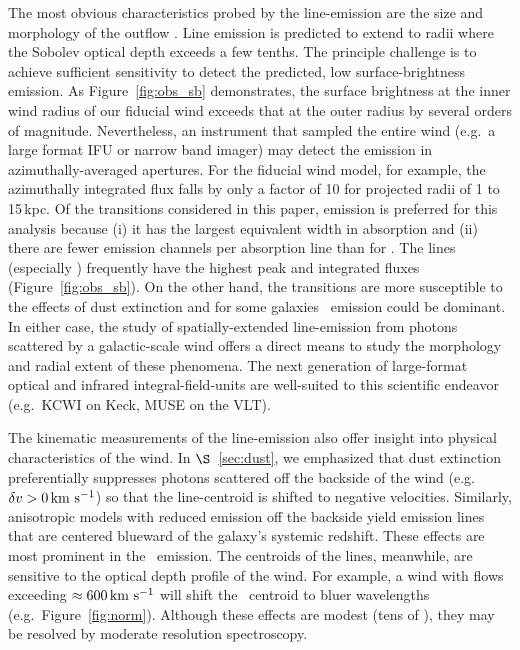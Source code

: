 \documentclass[]{emulateapj}
\begin{document}
The most obvious characteristics probed by the line-emission are
the size and morphology of the outflow \citep{rubin+10c}.  
Line emission is predicted to extend to radii where the Sobolev
optical depth exceeds a few tenths.  The principle
challenge is to achieve sufficient sensitivity to detect the
predicted,
low surface-brightness emission. As Figure~\ref{fig:obs_sb}
demonstrates, the surface brightness at the inner wind radius of our
fiducial wind exceeds that at the outer radius by several orders of magnitude.
Nevertheless, an instrument that sampled the entire wind (e.g.\ a
large format IFU or narrow band imager) may detect the emission in
azimuthally-averaged apertures. 
For the fiducial wind model, for example, the azimuthally integrated
flux falls by only a factor of 10 for projected radii of 1 to 15\,kpc.
Of the transitions considered in this paper,  emission is
preferred for this analysis because 
(i) it has the largest equivalent width in absorption and
(ii) there are fewer emission channels per absorption line than for
.  The  lines (especially \mgiib) frequently have the
highest peak and integrated fluxes (Figure~\ref{fig:obs_sb}).  
On the other hand, the  transitions are more susceptible to
the effects of dust extinction and for some galaxies \feiis\ emission
could be dominant.  In either case, the study of spatially-extended
line-emission from photons scattered by a galactic-scale wind offers
a direct means to study the morphology and radial extent of these
phenomena.  The next generation of large-format optical and infrared
integral-field-units are well-suited to this scientific endeavor
(e.g.\ KCWI on Keck, MUSE on the VLT).

The kinematic measurements of the line-emission also offer insight into physical
characteristics of the wind.
In $\S$~\ref{sec:dust}, we emphasized that dust extinction
preferentially suppresses photons scattered off the backside of the
wind (e.g.\ $\delta v > 0 \, {\rm km~s^{-1}}$) so that the line-centroid is shifted to
negative velocities.  Similarly, anisotropic models with reduced
emission off the backside yield emission lines that are centered
blueward of the galaxy's systemic redshift.  These effects are most
prominent in the \feiis\ emission.  The centroids of the 
lines, meanwhile, are sensitive to the optical depth
profile of the wind.   For example, a wind with flows exceeding
$\approx 600 \, {\rm km~s^{-1}}$ will shift the \mgiia\ centroid to bluer
wavelengths (e.g.\ Figure~\ref{fig:norm}).
Although these effects are modest (tens of
\kms), they may be resolved by moderate resolution spectroscopy.
\end{document}
